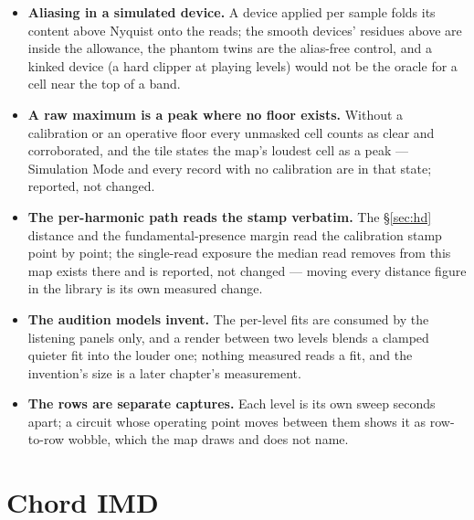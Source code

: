 \documentclass[11pt,a4paper]{article}
\begin{document}
{\begin{itemize}
  \item \textbf{Aliasing in a simulated device.} A device applied per
  sample folds its content above Nyquist onto the reads; the smooth
  devices' residues above are inside the allowance, the phantom twins are
  the alias-free control, and a kinked device (a hard clipper at playing
  levels) would not be the oracle for a cell near the top of a band.
  \item \textbf{A raw maximum is a peak where no floor exists.} Without a
  calibration or an operative floor every unmasked cell counts as clear
  and corroborated, and the tile states the map's loudest cell as a peak
  --- Simulation Mode and every record with no calibration are in that
  state; reported, not changed.
  \item \textbf{The per-harmonic path reads the stamp verbatim.} The
  \S\ref{sec:hd} distance and the fundamental-presence margin read the
  calibration stamp point by point; the single-read exposure the median
  read removes from this map exists there and is reported, not changed ---
  moving every distance figure in the library is its own measured change.
  \item \textbf{The audition models invent.} The per-level fits are
  consumed by the listening panels only, and a render between two levels
  blends a clamped quieter fit into the louder one; nothing measured reads
  a fit, and the invention's size is a later chapter's measurement.
  \item \textbf{The rows are separate captures.} Each level is its own
  sweep seconds apart; a circuit whose operating point moves between them
  shows it as row-to-row wobble, which the map draws and does not name.
\end{itemize}
\par}

\clearpage
\section{Chord IMD}
\label{sec:imd}

\end{document}
